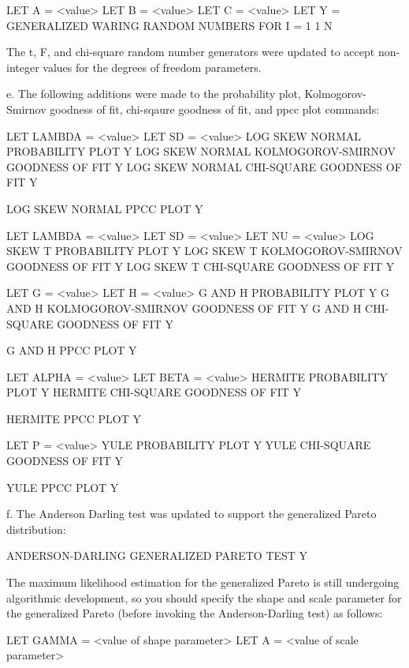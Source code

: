 {         LET A = <value>
         LET B = <value>
         LET C = <value>
         LET Y = GENERALIZED WARING RANDOM NUMBERS FOR I = 1 1 N

       The t, F, and chi-square random number generators were
       updated to accept non-integer values for the degrees of
       freedom parameters.

    e. The following additions were made to the probability plot,
       Kolmogorov-Smirnov goodness of fit, chi-sqaure goodness of
       fit, and ppcc plot commands:

          LET LAMBDA = <value>
          LET SD = <value>
          LOG SKEW NORMAL PROBABILITY PLOT Y
          LOG SKEW NORMAL KOLMOGOROV-SMIRNOV GOODNESS OF FIT Y
          LOG SKEW NORMAL CHI-SQUARE GOODNESS OF FIT Y

          LOG SKEW NORMAL PPCC PLOT Y

          LET LAMBDA = <value>
          LET SD = <value>
          LET NU = <value>
          LOG SKEW T PROBABILITY PLOT Y
          LOG SKEW T KOLMOGOROV-SMIRNOV GOODNESS OF FIT Y
          LOG SKEW T CHI-SQUARE GOODNESS OF FIT Y

          LET G = <value>
          LET H = <value>
          G AND H PROBABILITY PLOT Y
          G AND H KOLMOGOROV-SMIRNOV GOODNESS OF FIT Y
          G AND H CHI-SQUARE GOODNESS OF FIT Y

          G AND H PPCC PLOT Y

          LET ALPHA = <value>
          LET BETA = <value>
          HERMITE PROBABILITY PLOT Y
          HERMITE CHI-SQUARE GOODNESS OF FIT Y

          HERMITE PPCC PLOT Y

          LET P = <value>
          YULE PROBABILITY PLOT Y
          YULE CHI-SQUARE GOODNESS OF FIT Y

          YULE PPCC PLOT Y

    f. The Anderson Darling test was updated to support the
       generalized Pareto distribution:

         ANDERSON-DARLING GENERALIZED PARETO TEST Y

       The maximum likelihood estimation for the generalized
       Pareto is still undergoing algorithmic development, so
       you should specify the shape and scale parameter for
       the generalized Pareto (before invoking the Anderson-Darling
       test) as follows:

          LET GAMMA = <value of shape parameter>
          LET A = <value of scale parameter>

}
